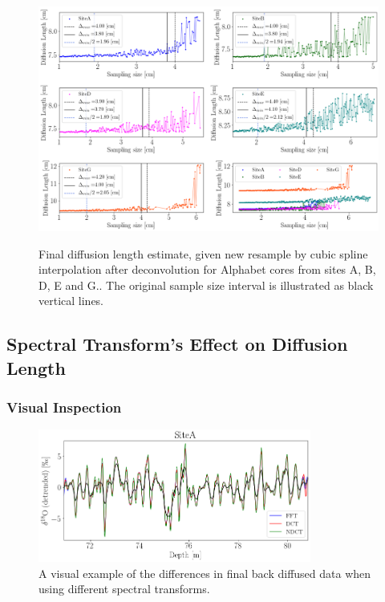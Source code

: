 \documentclass[../../CompleteThesis2/Complete_2ndDraft]{subfiles}
\begin{document}
\begin{figure}[h]
	\centering
	\includegraphics[width=\textwidth]{AllCores_InterpAF_deltaVSdiffLen_BD.png}
	\caption[Diffusion length versus resampling size after deconvolution, all cores.]{\small Final diffusion length estimate, given new resample by cubic spline interpolation after deconvolution for Alphabet cores from sites A, B, D, E and G.. The original sample size interval is illustrated as black vertical lines.}
	\label{Fig:COMPMETH_AllCores_SamplingVsDiffLen}\textit{}
\end{figure}


\subsection[Spectral Transforms]{Spectral Transform's Effect on Diffusion Length}
\label{Subsec:Method_TestStab_SpecTrans}

\subsubsection{Visual Inspection}
\label{Subsubsec:Method_TestStab_SpecTrans_VisInspection}

\begin{figure}[h]
	\centering
	\includegraphics[width=0.8\textwidth]{SiteA_SpecTrans_VisInspection.png}
	\caption[Qualitative Example of Spectral Transform's Effect on $\sigma$]{\small A visual example of the differences in final back diffused data when using different spectral transforms. }
	\label{fig:SiteA_SpecTrans_VisInspection}
\end{figure}
\end{document}
